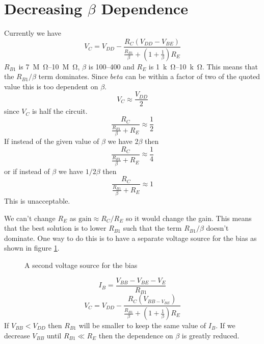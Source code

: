 \documentclass{article}
\begin{document}
    \section{Decreasing \(\beta\) Dependence}
    Currently we have
    \[V_C = V_{DD} - \frac{R_C(V_{DD} - V_{BE})}{\frac{R_{B1}}{\beta} + \left(1 + \frac{1}{\beta}\right)R_E}\]
    \(R_{B1}\) is \SIrange{7}{10}{M\ohm}, \(\beta\) is \SIrange{100}{400}{} and \(R_E\) is \SIrange{1}{10}{k\ohm}. 
    This means that the \(R_{B1}/\beta\) term dominates.
    Since \(beta\) can be within a factor of two of the quoted value this is too dependent on \(\beta\).
    \[V_C\approx \frac{V_{DD}}{2}\]
    since \(V_C\) is half the circuit.
    \[\frac{R_C}{\frac{R_{B1}}{\beta} + R_E} \approx \frac{1}{2}\]
    If instead of the given value of \(\beta\) we have \(2\beta\) then
    \[\frac{R_C}{\frac{R_{B1}}{\beta} + R_E} \approx \frac{1}{4}\]
    or if instead of \(\beta\) we have \(1/2\beta\) then
    \[\frac{R_C}{\frac{R_{B1}}{\beta} + R_E} \approx 1\]
    This is unacceptable.
    
    We can't change \(R_E\) as \(\text{gain}\approx R_C/R_E\) so it would change the gain.
    This means that the best solution is to lower \(R_{B1}\) such that the term \(R_{B1}/\beta\) doesn't dominate.
    One way to do this is to have a separate voltage source for the bias as shown in figure \ref{fig:separate voltage source}.
    \begin{figure}[ht]
        \centering
        \caption{A second voltage source for the bias}
        \label{fig:separate voltage source}
    \end{figure}
    \[I_B = \frac{V_{BB} - V_{BE} - V_E}{R_{B1}}\]
    \[V_C = V_{DD} - \frac{R_C(V_{BB - V_{BE}})}{\frac{R_{B1}}{\beta} + \left(1 + \frac{1}{\beta}\right)R_E}\]
    If \(V_{BB} < V_{DD}\) then \(R_{B1}\) will be smaller to keep the same value of \(I_B\).
    If we decrease \(V_{BB}\) until \(R_{B1} \ll R_E\) then the dependence on \(\beta\) is greatly reduced.
    
\end{document}
